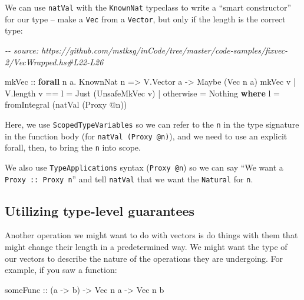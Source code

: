 \documentclass[]{article}
\newenvironment{Shaded}{}{}
\newcommand{\CommentTok}[1]{\textcolor[rgb]{0.38,0.63,0.69}{\textit{#1}}}
\newcommand{\DataTypeTok}[1]{\textcolor[rgb]{0.56,0.13,0.00}{#1}}
\newcommand{\FunctionTok}[1]{\textcolor[rgb]{0.02,0.16,0.49}{#1}}
\newcommand{\KeywordTok}[1]{\textcolor[rgb]{0.00,0.44,0.13}{\textbf{#1}}}
\newcommand{\NormalTok}[1]{#1}
\newcommand{\OperatorTok}[1]{\textcolor[rgb]{0.40,0.40,0.40}{#1}}
\newcommand{\OtherTok}[1]{\textcolor[rgb]{0.00,0.44,0.13}{#1}}
\begin{document}
We can use \texttt{natVal} with the \texttt{KnownNat} typeclass to write a
``smart constructor'' for our type -- make a \texttt{Vec} from a
\texttt{Vector}, but only if the length is the correct type:

\begin{Shaded}
\begin{Highlighting}[]
\CommentTok{{-}{-} source: https://github.com/mstksg/inCode/tree/master/code{-}samples/fixvec{-}2/VecWrapped.hs\#L22{-}L26}

\OtherTok{mkVec ::} \KeywordTok{forall}\NormalTok{ n a}\OperatorTok{.} \DataTypeTok{KnownNat}\NormalTok{ n }\OtherTok{=\textgreater{}} \DataTypeTok{V.Vector}\NormalTok{ a }\OtherTok{{-}\textgreater{}} \DataTypeTok{Maybe}\NormalTok{ (}\DataTypeTok{Vec}\NormalTok{ n a)}
\NormalTok{mkVec v }\OperatorTok{|}\NormalTok{ V.length v }\OperatorTok{==}\NormalTok{ l }\OtherTok{=} \DataTypeTok{Just}\NormalTok{ (}\DataTypeTok{UnsafeMkVec}\NormalTok{ v)}
        \OperatorTok{|} \FunctionTok{otherwise}       \OtherTok{=} \DataTypeTok{Nothing}
  \KeywordTok{where}
\NormalTok{    l }\OtherTok{=} \FunctionTok{fromIntegral}\NormalTok{ (natVal (}\DataTypeTok{Proxy} \OperatorTok{@}\NormalTok{n))}
\end{Highlighting}
\end{Shaded}

Here, we use \texttt{ScopedTypeVariables} so we can refer to the \texttt{n} in
the type signature in the function body (for \texttt{natVal\ (Proxy\ @n)}), and
we need to use an explicit forall, then, to bring the \texttt{n} into scope.

We also use \texttt{TypeApplications} syntax (\texttt{Proxy\ @n}) so we can say
``We want a \texttt{Proxy\ ::\ Proxy\ n}'' and tell \texttt{natVal} that we want
the \texttt{Natural} for \texttt{n}.

\subsection{Utilizing type-level
guarantees}\label{utilizing-type-level-guarantees}

Another operation we might want to do with vectors is do things with them that
might change their length in a predetermined way. We might want the type of our
vectors to describe the nature of the operations they are undergoing. For
example, if you saw a function:

\begin{Shaded}
\begin{Highlighting}[]
\OtherTok{someFunc ::}\NormalTok{ (a }\OtherTok{{-}\textgreater{}}\NormalTok{ b) }\OtherTok{{-}\textgreater{}} \DataTypeTok{Vec}\NormalTok{ n a }\OtherTok{{-}\textgreater{}} \DataTypeTok{Vec}\NormalTok{ n b}
\end{Highlighting}
\end{Shaded}
\end{document}
